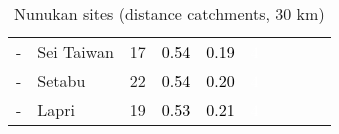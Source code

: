 \begin{table}[ht]
\begin{tabular}{C{0.05\textwidth}C{0.15\textwidth}C{0.08\textwidth}C{0.08\textwidth}C{0.08\textwidth}C{0.08\textwidth}C{0.08\textwidth}C{0.08\textwidth}C{0.08\textwidth}C{0.08\textwidth}}
  {-} & Sei Taiwan &  17 & \textcolor[HTML]{000000}{0.54} & \textcolor[HTML]{000000}{0.19} & \textcolor[HTML]{FFFFFF}{4} &  &  &  &  \\ 
  {-} & Setabu &  22 & \textcolor[HTML]{000000}{0.54} & \textcolor[HTML]{000000}{0.20} & \textcolor[HTML]{FFFFFF}{4} &  &  &  &  \\ 
  {-} & Lapri &  19 & \textcolor[HTML]{000000}{0.53} & \textcolor[HTML]{000000}{0.21} & \textcolor[HTML]{FFFFFF}{4} &  &  &  &  \\ 
  \end{tabular}
\endgroup
\caption{Nunukan sites (distance catchments, 30 km)} 
\label{tab:nunukan_dist}
\end{table}
